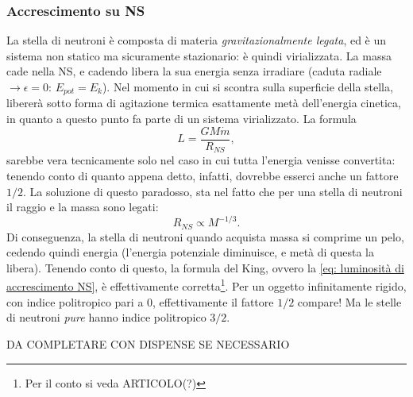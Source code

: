 \subsubsection{Accrescimento su NS}
La stella di neutroni è composta di materia \textit{gravitazionalmente legata}, ed è un sistema non statico ma sicuramente stazionario: è quindi virializzata.
La massa cade nella NS, e cadendo libera la sua energia senza irradiare (caduta radiale $\xrightarrow{}\epsilon=0 $: $E_{pot}=E_k$).
Nel momento in cui si scontra sulla superficie della stella, libererà sotto forma di agitazione termica esattamente metà dell'energia cinetica, in quanto a questo punto fa parte di un sistema virializzato.
La formula 
\begin{equation}
    L=\frac{GM\dot{m}}{R_{NS}},
    \label{eq: luminosità di accrescimento NS}
\end{equation}
sarebbe vera tecnicamente solo nel caso in cui tutta l'energia venisse convertita: tenendo conto di quanto appena detto, infatti, dovrebbe esserci anche un fattore $1/2$.
La soluzione di questo paradosso, sta nel fatto che per una stella di neutroni il raggio e la massa sono legati:
\begin{equation}
    R_{NS}\propto M^{-1/3}.   
\end{equation}
Di conseguenza, la stella di neutroni quando acquista massa si comprime un pelo, cedendo quindi energia (l'energia potenziale diminuisce, e metà di questa la libera).
Tenendo conto di questo, la formula del King, ovvero la \eqref{eq: luminosità di accrescimento NS}, è effettivamente corretta\footnote{Per il conto si veda ARTICOLO(?)}.
Per un oggetto infinitamente rigido, con indice politropico pari a $0$, effettivamente il fattore $1/2$ compare! 
Ma le stelle di neutroni \textit{pure} hanno indice politropico $3/2$.

DA COMPLETARE CON DISPENSE SE NECESSARIO
